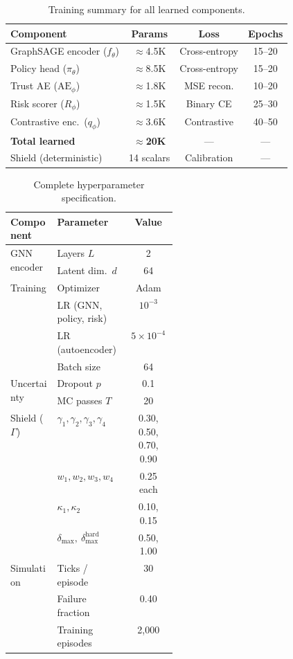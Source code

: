 \begin{table}[t]
\centering
\caption{Training summary for all learned components.}
\label{art3:tab:training_summary}
\begin{tabular}{lccc}
\toprule
Component & Params & Loss & Epochs \\
\midrule
GraphSAGE encoder ($f_\theta$) & $\approx$4.5K & Cross-entropy & 15--20 \\
Policy head ($\pi_\theta$) & $\approx$8.5K & Cross-entropy & 15--20 \\
Trust AE ($\mathrm{AE}_\phi$) & $\approx$1.8K & MSE recon. & 10--20 \\
Risk scorer ($R_\phi$) & $\approx$1.5K & Binary CE & 25--30 \\
Contrastive enc.\ ($q_\phi$) & $\approx$3.6K & Contrastive & 40--50 \\
\midrule
\textbf{Total learned} & $\approx$\textbf{20K} & --- & --- \\
Shield (deterministic) & 14 scalars & Calibration & --- \\
\bottomrule
\end{tabular}
\end{table}


\begin{table}[t]
\centering
\caption{Complete hyperparameter specification.}
\label{art3:tab:hyperparameters}
\footnotesize
\begin{tabular}{p{0.28\linewidth}lc}
\toprule
Component & Parameter & Value \\
\midrule
\multirow{2}{*}{GNN encoder}
  & Layers $L$ & 2 \\
  & Latent dim.\ $d$ & 64 \\
\midrule
\multirow{4}{*}{Training}
  & Optimizer & Adam \\
  & LR (GNN, policy, risk) & $10^{-3}$ \\
  & LR (autoencoder) & $5\!\times\!10^{-4}$ \\
  & Batch size & 64 \\
\midrule
\multirow{2}{*}{Uncertainty}
  & Dropout $p$ & 0.1 \\
  & MC passes $T$ & 20 \\
\midrule
\multirow{4}{*}{Shield ($\Gamma$)}
  & $\gamma_1,\gamma_2,\gamma_3,\gamma_4$ & 0.30, 0.50, 0.70, 0.90 \\
  & $w_1,w_2,w_3,w_4$ & 0.25 each \\
  & $\kappa_1, \kappa_2$ & 0.10, 0.15 \\
  & $\delta_{\max},\ \delta_{\max}^{\mathrm{hard}}$ & 0.50, 1.00 \\
\midrule
\multirow{3}{*}{Simulation}
  & Ticks / episode & 30 \\
  & Failure fraction & 0.40 \\
  & Training episodes & 2,000 \\
\bottomrule
\end{tabular}
\end{table}


